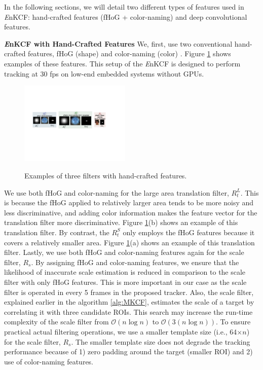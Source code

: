 \documentclass[10pt,twocolumn,letterpaper]{article}
\begin{document}
In the following sections, we will detail two different types of
features used in {\it E}nKCF: hand-crafted features (fHoG +
color-naming) and deep convolutional features.

\textbf{{\it E}nKCF with Hand-Crafted Features} We, first, use two
conventional hand-crafted features, fHoG (shape)
\cite{felzenszwalb2010object} and color-naming (color)
\cite{li2014scale}. Figure \ref{fig:Filters} shows examples of these
features. This setup of the {\it E}nKCF is designed to perform
tracking at $30$ fps on low-end embedded systems without GPUs.
\begin{figure}[!h]
\centering
\includegraphics[width=0.47\textwidth]{./figures/Filters_Details.pdf}
   \\[-3ex]
\label{fig:Rt_S}
\quad{}\label{fig:Rt_L}
\quad\quad{}\label{fig:Rs}
\caption{Examples of three filters with hand-crafted features.}
\label{fig:Filters}
\end{figure}

We use both fHoG \cite{felzenszwalb2010object} and color-naming
\cite{van2009learning} for the large area translation filter,
$R_{t}^{L}$. This is because the fHoG applied to relatively larger
area tends to be more noisy and less discriminative, and adding color
information makes the feature vector for the translation filter more
discriminative. Figure \ref{fig:Filters}(b) shows an example of this
translation filter. By contrast, the $R_{t}^{S}$ only employs the fHoG
features because it covers a relatively smaller area.  Figure
\ref{fig:Filters}(a) shows an example of this translation
filter. Lastly, we use both fHoG and color-naming features again for
the scale filter, $R_{s}$. By assigning fHoG and color-naming
features, we ensure that the likelihood of inaccurate scale estimation
is reduced in comparison to the scale filter with only fHoG
features. This is more important in our case as the scale filter is
operated in every 5 frames in the proposed tracker. Also, the scale
filter, explained earlier in the algorithm \ref{alg:MKCF}, estimates
the scale of a target by correlating it with three candidate
ROIs. This search may increase the run-time complexity of the scale
filter from $\mathcal{O}(n\log n)$ to $\mathcal{O}(3(n\log n))$. To
ensure practical actual filtering operations, we use a smaller
template size (i.e., 64$\times n$) for the scale filter, $R_{s}$. The
smaller template size does not degrade the tracking performance
because of 1) zero padding around the target (smaller ROI) and 2) use
of color-naming features.
\end{document}
